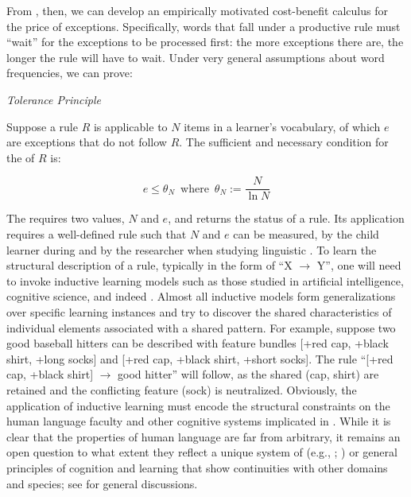 \documentclass[output=paper,
modfonts
]{LSP/langsci}
\begin{document}
From , then, we can develop  an empirically motivated
cost-benefit calculus for the price of exceptions.  Specifically, 
words that fall under a productive rule must ``wait'' for the
exceptions to be processed first: the
more exceptions there are, the longer the rule will have to wait.
Under very general assumptions about word frequencies, we can prove:

\begin{exe} \ex \label{TP}
\textit{Tolerance Principle} 

Suppose a rule  $R$ is applicable to $N$ items in a learner's
vocabulary, of which $e$ are exceptions that do not follow $R$. The
sufficient and necessary condition for the  of $R$ is:  

\[ e \leq \theta_N\,\,\,\mbox{where}\,\,\, \theta_N := \frac{N}{\ln N} \]

\end{exe}
The   requires two  values,
$N$ and $e$, and returns the  status of a rule.  Its
application  requires a well-defined rule such that $N$ and $e$ can be
measured, by the child learner during  and by the
researcher when studying linguistic . To learn the 
structural description of a rule, typically in the form of ``X
$\longrightarrow$ Y'', one will need to invoke  inductive learning
models such as  those studied in artificial intelligence, cognitive
science, and indeed  \citep[e.g.,][]{LSLT}. Almost all inductive
models  form generalizations over specific learning instances and try
to discover the  shared characteristics of individual elements associated with a shared
pattern.  For example, suppose two good baseball hitters can be
described with feature bundles  [+red cap, +black shirt, +long socks]
and [+red cap, +black shirt, +short socks]. The rule 
``[+red cap, +black shirt] 
$\longrightarrow$ good hitter'' will follow, as the shared 
(cap, shirt) are retained and the conflicting feature (sock) is
neutralized. Obviously, the application of inductive learning 
 must  encode the structural constraints on
the human language faculty and other cognitive systems  implicated
in  \citep{ASPECTS}. While it is clear that the
properties  of human language are far from arbitrary, it
remains an open question to what extent they reflect a
unique system of  (e.g., ;
\citealt{Berwick2016}) or  general principles of  cognition and 
learning that  show continuities with other domains and species;
see \citealt{Yang2004, Chomsky2005, Yang2017} for general discussions.  
\end{document}
